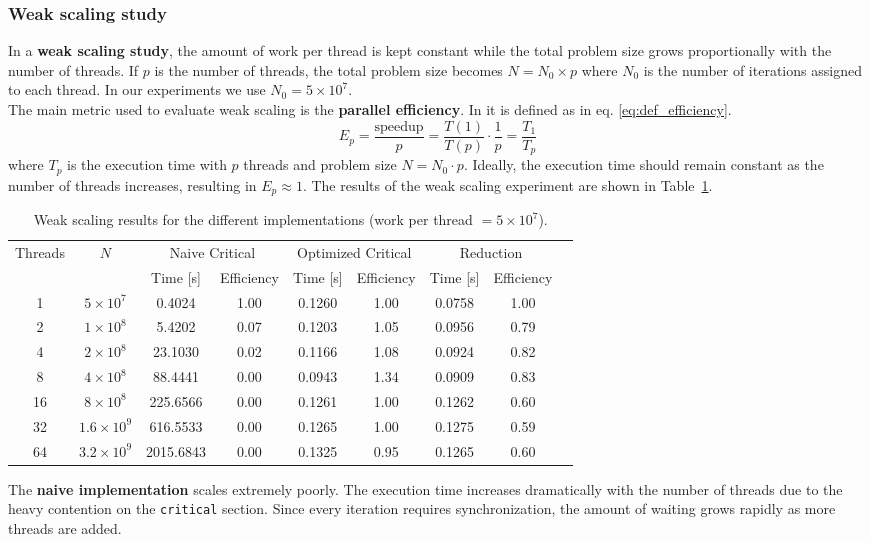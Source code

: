 \documentclass[unicode,10pt,a4paper,oneside,numbers=endperiod,openany]{scrartcl}
\begin{document}
\subsubsection{Weak scaling study}

In a \textbf{weak scaling study}, the amount of work per thread is kept constant while the total problem size grows proportionally with the number of threads. If $p$ is the number of threads, the total problem size becomes $ N = N_0 \times p $ where $N_0$ is the number of iterations assigned to each thread. In our experiments we use $ N_0 = 5 \times 10^7 $.\\
The main metric used to evaluate weak scaling is the \textbf{parallel efficiency}. In \cite[p.~125]{hager2010hpc} it is defined as in eq. \ref{eq:def_efficiency}.
\begin{equation}
E_p = \frac{\text{speedup}}{p} = \frac{T(1)}{T(p)} \cdot \frac{1}{p} = \frac{T_1}{T_p}
\label{eq:def_efficiency}
\end{equation}
where $T_p$ is the execution time with $p$ threads and problem size $N = N_0\cdot p$. Ideally, the execution time should remain constant as the number of threads increases, resulting in $E_p \approx 1$. The results of the weak scaling experiment are shown in Table~\ref{tab:weak_scaling}.

\begin{table}[!h]
\centering
\caption{Weak scaling results for the different implementations (work per thread $=5\times10^7$).}
\label{tab:weak_scaling}
\begin{tabular}{ccccccccc}
\hline
\multirow{2}{*}{Threads} &
\multirow{2}{*}{$N$} &
\multicolumn{2}{c}{Naive Critical} &
\multicolumn{2}{c}{Optimized Critical} &
\multicolumn{2}{c}{Reduction} \\
\cline{3-8}
 &  & Time [s] & Efficiency & Time [s] & Efficiency & Time [s] & Efficiency \\
\hline
1  & $5\times10^7$   & 0.4024 & 1.00 & 0.1260 & 1.00 & 0.0758 & 1.00 \\
2  & $1\times10^8$   & 5.4202 & 0.07 & 0.1203 & 1.05 & 0.0956 & 0.79 \\
4  & $2\times10^8$   & 23.1030 & 0.02 & 0.1166 & 1.08 & 0.0924 & 0.82 \\
8  & $4\times10^8$   & 88.4441 & 0.00 & 0.0943 & 1.34 & 0.0909 & 0.83 \\
16 & $8\times10^8$   & 225.6566 & 0.00 & 0.1261 & 1.00 & 0.1262 & 0.60 \\
32 & $1.6\times10^9$ & 616.5533 & 0.00 & 0.1265 & 1.00 & 0.1275 & 0.59 \\
64 & $3.2\times10^9$ & 2015.6843 & 0.00 & 0.1325 & 0.95 & 0.1265 & 0.60 \\
\hline
\end{tabular}
\end{table}
The \textbf{naive implementation} scales extremely poorly. The execution time increases dramatically with the number of threads due to the heavy contention on the \texttt{critical} section. Since every iteration requires synchronization, the amount of waiting grows rapidly as more threads are added.\\
\end{document}
